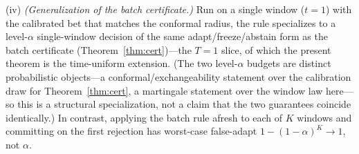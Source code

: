 \begin{theorem}
\textnormal{(iv)} \emph{(Generalization of the batch certificate.)} Run
on a single window ($t=1$) with the calibrated bet that matches the conformal
radius, the rule specializes to a level-$\alpha$ single-window decision of the same
adapt/freeze/abstain form as the batch certificate (Theorem~\ref{thm:cert})---the $T{=}1$ slice, of
which the present theorem is the time-uniform extension. (The two level-$\alpha$ budgets are distinct
probabilistic objects---a conformal/exchangeability statement over the calibration draw for
Theorem~\ref{thm:cert}, a martingale statement over the window law here---so this is a structural
specialization, not a claim that the two guarantees coincide identically.) In contrast, applying the batch rule afresh to each of $K$ windows and
committing on the first rejection has worst-case false-adapt
$1-(1-\alpha)^K\to1$, not $\alpha$.
\end{theorem}

